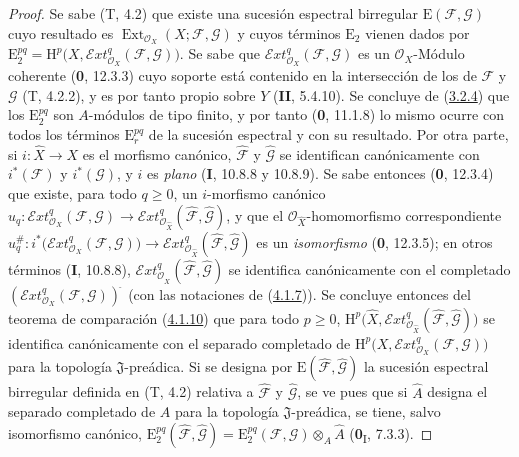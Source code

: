 \begin{proof}
Se sabe (T, 4.2) que existe una sucesión espectral birregular
$\mathrm E(\mathcal F,\mathcal G)$ cuyo resultado es
$\operatorname{Ext}_{\mathcal O_X}(X;\mathcal F,\mathcal G)$ y cuyos términos
$\mathrm E_2$ vienen dados por
$\mathrm E_2^{pq}=\mathrm H^p\bigl(X,
\mathcal{E}\!xt^q_{\mathcal O_X}(\mathcal F,\mathcal G)\bigr)$.
Se sabe que $\mathcal{E}\!xt^q_{\mathcal O_X}(\mathcal F,\mathcal G)$ es un
$\mathcal O_X$-Módulo coherente (\textbf{0}, 12.3.3) cuyo soporte está contenido en
la intersección de los de $\mathcal F$ y $\mathcal G$ (T, 4.2.2), y es
por tanto propio sobre $Y$ (\textbf{II}, 5.4.10). Se concluye de
(\hyperref[III.3.2.4-fr]{3.2.4}) que los $\mathrm E_2^{pq}$ son
$A$-módulos de tipo finito, y por tanto (\textbf{0}, 11.1.8) lo mismo ocurre con todos
los términos $\mathrm E_r^{pq}$ de la sucesión espectral y con su resultado.
Por otra parte, si $i:\widehat X\to X$ es el morfismo canónico,
$\widehat{\mathcal F}$ y $\widehat{\mathcal G}$ se identifican canónicamente
con $i^*(\mathcal F)$ y $i^*(\mathcal G)$, y $i$ es \emph{plano} (\textbf{I}, 10.8.8 y
10.8.9). Se sabe entonces (\textbf{0}, 12.3.4) que existe, para todo $q\geq0$, un
$i$-morfismo canónico
$u_q:\mathcal{E}\!xt^q_{\mathcal O_X}(\mathcal F,\mathcal G)
\longrightarrow
\mathcal{E}\!xt^q_{\mathcal O_{\widehat X}}
(\widehat{\mathcal F},\widehat{\mathcal G})$,
y que el $\mathcal O_{\widehat X}$-homomorfismo correspondiente
$u_q^\#:i^*\bigl(\mathcal{E}\!xt^q_{\mathcal O_X}(\mathcal F,\mathcal G)\bigr)
\longrightarrow
\mathcal{E}\!xt^q_{\mathcal O_{\widehat X}}
(\widehat{\mathcal F},\widehat{\mathcal G})$
es un \emph{isomorfismo} (\textbf{0}, 12.3.5); en otros términos (\textbf{I}, 10.8.8),
$\mathcal{E}\!xt^q_{\mathcal O_{\widehat X}}
(\widehat{\mathcal F},\widehat{\mathcal G})$ se identifica canónicamente con el
completado $(\mathcal{E}\!xt^q_{\mathcal O_X}(\mathcal F,\mathcal G))^{\widehat{\,}}$ (con las
notaciones de (\hyperref[III.4.1.7-fr]{4.1.7})). Se concluye entonces del teorema de
comparación (\hyperref[III.4.1.10-fr]{4.1.10}) que para todo $p\geq0$,
$\mathrm H^p\bigl(\widehat X,
\mathcal{E}\!xt^q_{\mathcal O_{\widehat X}}
(\widehat{\mathcal F},\widehat{\mathcal G})\bigr)$
se identifica canónicamente con el separado completado
de
$\mathrm H^p\bigl(X,\mathcal{E}\!xt^q_{\mathcal O_X}
(\mathcal F,\mathcal G)\bigr)$ para la topología $\mathfrak J$-preádica.
Si se designa por $\mathrm E(\widehat{\mathcal F},
\widehat{\mathcal G})$ la sucesión espectral birregular definida en (T, 4.2)
relativa a $\widehat{\mathcal F}$ y $\widehat{\mathcal G}$, se ve pues que
si $\widehat A$ designa el separado completado de $A$ para la topología
$\mathfrak J$-preádica, se tiene, salvo isomorfismo canónico,
$\mathrm E_2^{pq}(\widehat{\mathcal F},\widehat{\mathcal G})
=\mathrm E_2^{pq}(\mathcal F,\mathcal G)\otimes_A\widehat A$
(\textbf{0}\textsubscript{I}, 7.3.3).


\end{proof}
